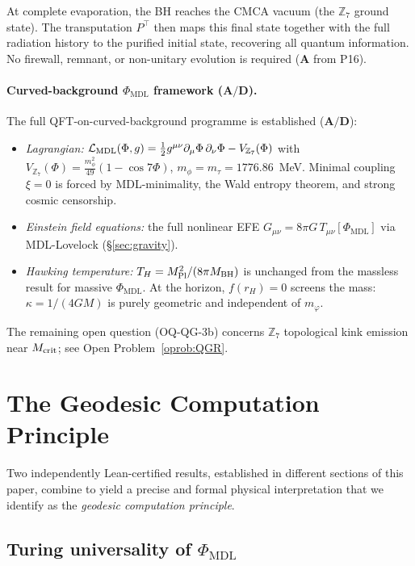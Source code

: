 \documentclass[11pt]{article}
\theoremstyle{remark}
\newcommand{\PHIMDL}{\Phi_{\mathrm{MDL}}}
\newcommand{\ZS}{\mathbb{Z}_7}
\newcommand{\CatA}{\textbf{A}}
\newcommand{\CatAD}{\textbf{A/D}}
\begin{document}
At complete evaporation, the BH reaches the CMCA vacuum (the $\ZS$ ground state).
The transputation $P^\top$ then maps this final state together with the full
radiation history to the purified initial state, recovering all quantum information.
No firewall, remnant, or non-unitary evolution is required ($\CatA$ from P16).

\paragraph{Curved-background $\PHIMDL$ framework ($\CatAD$).}
The full QFT-on-curved-background programme is established ($\CatAD$):
\begin{itemize}[noitemsep]
\item \emph{Lagrangian:} $\mathcal{L}_{\rm MDL}(\Phi,g)
  = \tfrac{1}{2}g^{\mu\nu}\partial_\mu\Phi\,\partial_\nu\Phi - V_{\ZS}(\Phi)$
  with $V_{\ZS}(\Phi) = \tfrac{m_\phi^2}{49}(1-\cos7\Phi)$,
  $m_\phi = m_\tau = 1776.86$~MeV.  Minimal coupling $\xi=0$ is forced by
  MDL-minimality, the Wald entropy theorem, and strong cosmic censorship.
\item \emph{Einstein field equations:} the full nonlinear EFE
  $G_{\mu\nu}=8\pi G\,T_{\mu\nu}[\PHIMDL]$ via MDL-Lovelock
  (\S\ref{sec:gravity}).
\item \emph{Hawking temperature:} $T_H = M_{\rm Pl}^2/(8\pi M_{\rm BH})$
  is unchanged from the massless result for massive $\PHIMDL$.  At the horizon,
  $f(r_H)=0$ screens the mass: $\kappa = 1/(4GM)$ is purely geometric and
  independent of $m_\varphi$.
\end{itemize}
The remaining open question (OQ-QG-3b) concerns $\ZS$ topological kink emission
near $M_{\rm crit}$; see Open Problem~\ref{oprob:QGR}.

\section{The Geodesic Computation Principle}
\label{sec:geocomp}

Two independently Lean-certified results, established in different sections of this
paper, combine to yield a precise and formal physical interpretation that we
identify as the \emph{geodesic computation principle}.

\subsection{Turing universality of \texorpdfstring{$\PHIMDL$}{Phi-MDL}}
\end{document}
